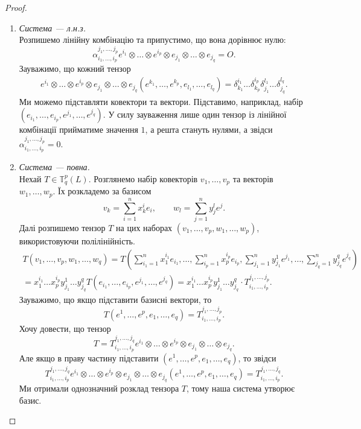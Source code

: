 \documentclass{math_library}
\begin{document}
\begin{proof}
\begin{enumerate}[topsep=0pt,label={\Roman*.},wide=0pt]
\item \textit{Система --- л.н.з.}\\
Розпишемо лінійну комбінацію та припустимо, що вона дорівнює нулю:
\[
\alpha_{i_1,\dots,i_p}^{j_1,\dots,j_p} e^{i_1} \otimes \dots \otimes e^{i_p} \otimes e_{j_1} \otimes \dots \otimes e_{j_q} = O.
\]
Зауважимо, що кожний тензор
\begin{align*}
e^{i_1} \otimes \dots \otimes e^{i_p} \otimes e_{j_1} \otimes \dots \otimes e_{j_q} (e^{k_1},\dots,e^{k_p},e_{l_1},\dots,e_{l_q}) = \delta^{i_1}_{k_1} \dots \delta^{i_p}_{k_p} \delta_{j_1}^{l_1} \dots \delta_{j_q}^{l_q}.
\end{align*}
Ми можемо підставляти ковектори та вектори. Підставимо, наприклад, набір $(e_{i_1},\dots,e_{i_p},e^{j_1},\dots,e^{j_q})$. У силу зауваження лише один тензор із лінійної комбінації прийматиме значення $1$, а решта стануть нулями, а звідси $\alpha_{i_1,\dots,i_p}^{j_1,\dots,j_p} = 0$.

\item \textit{Система --- повна.}\\
Нехай $T \in \mathbb{T}_q^p(L)$. Розглянемо набір ковекторів $v_1,\dots,v_p$ та векторів $w_1,\dots,w_p$. Їх розкладемо за базисом
\[
v_k = \displaystyle\sum_{i=1}^n x_k^i e_i, \qquad w_l = \sum_{j=1}^n y_j^l e^j.
\]
Далі розпишемо тензор $T$ на цих наборах $(v_1,\dots,v_p,w_1,\dots,w_p)$, використовуючи полілінійність.
\begin{align*}
T(v_1,\dots,v_p,w_1,\dots,w_q) = \displaystyle T\left( \sum_{i_1=1}^n x_1^{i_1} e_{i_1}, \dots, \sum_{i_p=1}^n x_p^{i_p} e_{i_p}, \sum_{j_1=1}^n y_{j_1}^1 e^{j_1},\dots, \sum_{j_q=1}^n y_{j_q}^q e^{j_q} \right) \\
= x_1^{i_1} \dots x_p^{i_p} y_{j_1}^1 \dots y_{j_q}^q T(e_{i_1},\dots,e_{i_p},e^{j_1},\dots,e^{j_q}) = x_1^{i_1} \dots x_p^{i_p} y_{j_1}^1 \dots y_{j_q}^q \cdot T_{i_1,\dots,i_p}^{j_1,\dots,j_p}.
\end{align*}
Зауважимо, що якщо підставити базисні вектори, то
\[
T(e^1,\dots,e^p,e_1,\dots,e_q) = T_{i_1,\dots,i_p}^{j_1,\dots,j_p}.
\]
Хочу довести, що тензор
\[
T = T_{i_1,\dots,i_p}^{j_1,\dots,j_q} e^{i_1} \otimes \dots \otimes e^{i_p} \otimes e_{j_1} \otimes \dots \otimes e_{j_q}.
\]
Але якщо в праву частину підставити $(e^1,\dots,e^p,e_1,\dots,e_q)$, то звідси
\[
T_{i_1,\dots,i_p}^{j_1,\dots,j_q} e^{i_1} \otimes \dots \otimes e^{i_p} \otimes e_{j_1} \otimes \dots \otimes e_{j_q} (e^1,\dots,e^p,e_1,\dots,e_q) = T_{i_1,\dots,i_p}^{j_1,\dots,j_q}.
\]
Ми отримали однозначний розклад тензора $T$, тому наша система утворює базис.
\qedhere
\end{enumerate}
\end{proof}
\end{document}
